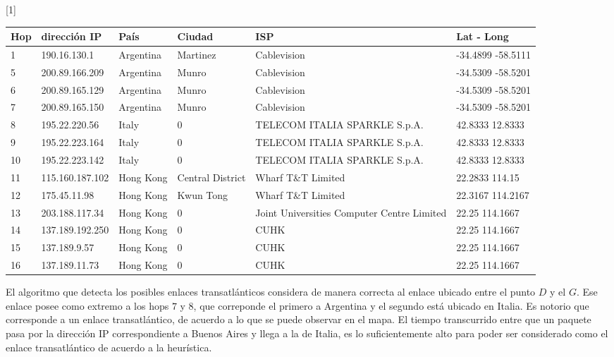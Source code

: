 
\begin{center}
\scalebox{0.7}[1]{
 \begin{tabular}{|l|l|l|l|l|l|}
    \hline 
    Hop & dirección IP & País & Ciudad & ISP & Lat - Long \\
    \hline
    1 & 190.16.130.1 & Argentina & Martinez & Cablevision & -34.4899 -58.5111	\\
    5 & 200.89.166.209 & Argentina & Munro & Cablevision & -34.5309 -58.5201	\\
    6 & 200.89.165.129 & Argentina & Munro & Cablevision & -34.5309 -58.5201	\\
    7 & 200.89.165.150 & Argentina & Munro & Cablevision & -34.5309 -58.5201	\\
    8 & 195.22.220.56 & Italy & 0 & TELECOM ITALIA SPARKLE S.p.A. & 42.8333 12.8333	\\
    9 & 195.22.223.164 & Italy & 0 & TELECOM ITALIA SPARKLE S.p.A. & 42.8333 12.8333	\\
    10 & 195.22.223.142 & Italy & 0 & TELECOM ITALIA SPARKLE S.p.A. & 42.8333 12.8333 \\
    11 & 115.160.187.102 & Hong Kong & Central District & Wharf T\&T Limited & 22.2833 114.15	\\
    12 & 175.45.11.98 & Hong Kong & Kwun Tong & Wharf T\&T Limited & 22.3167 114.2167	\\
    13 & 203.188.117.34 & Hong Kong & 0 & Joint Universities Computer Centre Limited & 22.25 114.1667	\\
    14 & 137.189.192.250 & Hong Kong & 0 & CUHK & 22.25 114.1667	\\
    15 & 137.189.9.57 & Hong Kong & 0 & CUHK & 22.25 114.1667	\\
    16 & 137.189.11.73 & Hong Kong & 0 & CUHK & 22.25 114.1667	\\
    \hline
 \end{tabular}}
\end{center}

El algoritmo que detecta los posibles enlaces transatlánticos considera de manera correcta al enlace ubicado entre el punto $D$ y el $G$. Ese enlace posee como extremo a los hops $7$ y $8$, que correponde el primero a Argentina y el segundo está ubicado en Italia. Es notorio que corresponde a un enlace transatlántico, de acuerdo a lo que se puede observar en el mapa. El tiempo transcurrido entre que un paquete pasa por la dirección IP correspondiente a Buenos Aires y llega a la de Italia, es lo suficientemente alto para poder ser considerado como el enlace transatlántico de acuerdo a la heurística.

